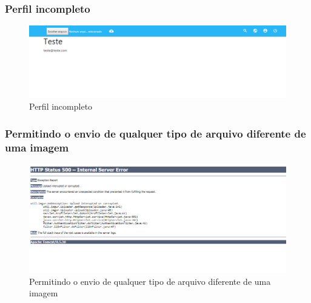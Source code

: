 \pagebreak

\subsubsection{Perfil incompleto}
\begin{figure}[ht]
	\centering
	\includegraphics[width=\textwidth]{./imagens/perfil_desarrumado.png}
	\caption{Perfil incompleto}
	\label{fig:casoDeUso}
\end{figure}

\pagebreak

\subsubsection{Permitindo o envio de qualquer tipo de arquivo diferente de uma imagem}
\begin{figure}[ht]
	\centering
	\includegraphics[width=\textwidth]{./imagens/erro_envio.png}
	\caption{Permitindo o envio de qualquer tipo de arquivo diferente de uma imagem}
	\label{fig:casoDeUso}
\end{figure}

\pagebreak

